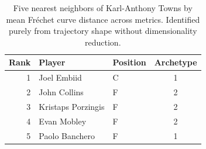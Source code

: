 \begin{table}[htbp]
  \centering\small
  \begin{tabular}{rllc}
    \toprule
    Rank & Player & Position & Archetype \\
    \midrule
    1 & Joel Embiid & C & 1 \\
    2 & John Collins & F & 2 \\
    3 & Kristaps Porzingis & F & 2 \\
    4 & Evan Mobley & F & 2 \\
    5 & Paolo Banchero & F & 1 \\
    \bottomrule
  \end{tabular}
  \caption{Five nearest neighbors of Karl-Anthony Towns by mean Fr\'{e}chet curve distance across metrics. Identified purely from trajectory shape without dimensionality reduction.}
  \label{tab:Karl_Anthony_Towns_frechet_curve_neighbors}
\end{table}

